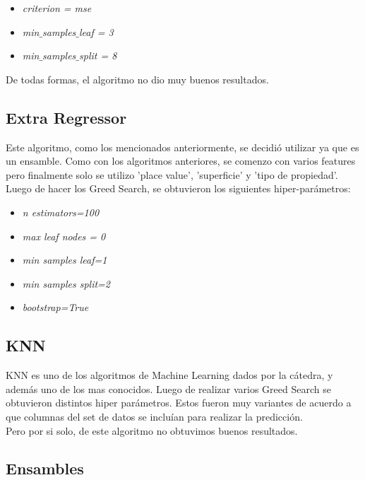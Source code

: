 \documentclass[a4paper, 10pt]{article}
\newcommand\tab[1][0.5cm]{\hspace*{#1}}
\begin{document}
			\begin{itemize}
				\item \emph{criterion = mse}
				\item \emph{min$\_$samples$\_$leaf = 3}
				\item \emph{min$\_$samples$\_$split = 8} 
			\end{itemize}
		\tab De todas formas, el algoritmo no dio muy buenos resultados.
		
		\subsection{Extra Regressor}
		Este algoritmo, como los mencionados anteriormente, se decidió utilizar ya que es un ensamble. Como con los algoritmos anteriores, se comenzo con varios features pero finalmente solo se utilizo 'place value', 'superficie' y 'tipo de propiedad'.
		Luego de hacer los Greed Search, se obtuvieron los siguientes hiper-parámetros:
		\begin{itemize}
		
		\item \emph{n estimators=100}
			
		\item \emph{max leaf nodes = 0}

		\item \emph{min samples leaf=1}
		
		\item \emph{min samples split=2}
		
		\item \emph{bootstrap=True}
	
		\end{itemize}				

		\subsection{KNN}
		
		KNN es uno de los algoritmos de Machine Learning dados por la cátedra, y además uno de los mas conocidos.
		Luego de realizar varios Greed Search se obtuvieron distintos hiper parámetros. Estos fueron muy variantes de acuerdo a que columnas del set de datos se incluían para realizar la predicción. \\

		\tab Pero por si solo, de este algoritmo no obtuvimos buenos resultados.

		\subsection{Ensambles}		
		
\end{document}
